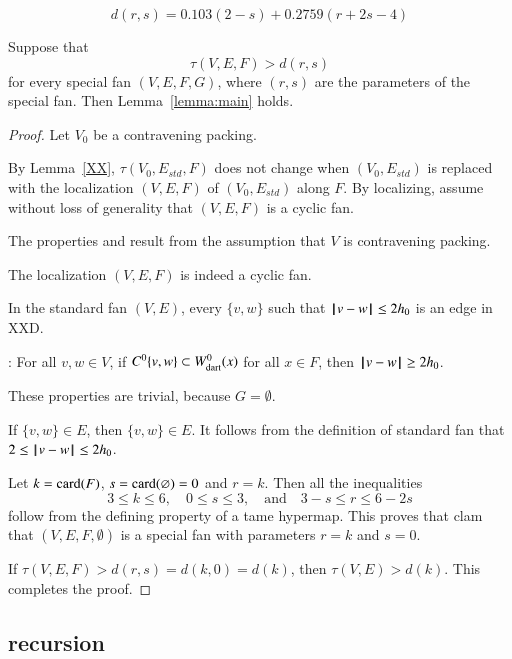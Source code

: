 \begin{definition}[d]
$$d(r,s) = 0.103 (2-s) + 0.2759 (r+2s-4) $$
\end{definition}

\begin{lemma}\guid{}
Suppose that 
$$
\tau(V,E,F) > d (r,s)
$$
for every special fan $(V,E,F,G)$,
where $(r,s)$ are the parameters of the special fan.
Then Lemma~\ref{lemma:main} holds.
\end{lemma}

\begin{proof}
Let $V_0$ be a contravening packing.

By Lemma~\ref{XX}, $\tau(V_0,E_{std},F)$ does not change when
$(V_0,E_{std})$ is replaced with the localization $(V,E,F)$ of $(V_0,E_{std})$ along $F$.  By
localizing, assume
without loss of generality that $(V,E,F)$ is a cyclic fan.

  The properties  and
 result from the assumption that $V$ is contravening
packing.  

  The localization $(V,E,F)$ is indeed a cyclic fan.

  In the standard fan $(V,E)$, every $\{v,w\}$ such that ${\hskip0.1em|\hskip-0.15em|\hskip0.1em}v - w{\hskip0.1em|\hskip-0.15em|\hskip0.1em}\le 2{h_0}$
is an edge in XXD.

: For all $v,w\in V$, if $C^0\{v,w\}\subset W^0_{\text{dart}}(x)$ for all $x\in F$, then ${\hskip0.1em|\hskip-0.15em|\hskip0.1em}v - w{\hskip0.1em|\hskip-0.15em|\hskip0.1em}\ge 2{h_0}$.

   These properties are trivial, because $G=\emptyset$.

 If $\{v,w\}\in E$, then $\{v,w\}\in E$.  It follows from the definition of
standard fan that $2\le {\hskip0.1em|\hskip-0.15em|\hskip0.1em}v - w{\hskip0.1em|\hskip-0.15em|\hskip0.1em}\le 2{h_0}$.

 Let $k={\operatorname{card}}(F)$, $s={\operatorname{card}}(\varnothing) = 0$ and $r=k$.  Then all the inequalities
$$3\le k\le 6,\quad 0\le s \le 3,\quad\text{and}\quad3-s \le r \le 6 - 2s$$
follow from the defining property  of a tame hypermap.  This proves that clam that
$(V,E,F,\emptyset)$ is a special fan with parameters $r=k$ and $s=0$.

If $\tau(V,E,F) > d(r,s) = d(k,0) = d(k)$, then $\tau(V,E) > d(k)$.  This completes the proof.
\end{proof}


\subsection{recursion}
%



